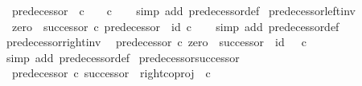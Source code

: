 \begin{isabellebody}
\ \ {\isachardoublequoteopen}predecessor\ {\isacharcolon}{\kern0pt}\ {\isasymnat}\isactrlsub c\ {\isasymrightarrow}\ {\isasymone}\ {\isasymCoprod}\ {\isasymnat}\isactrlsub c{\isachardoublequoteclose}\isanewline
%
\isadelimproof
\ \ %
\endisadelimproof
%
\isatagproof
{}\isamarkupfalse%
\ {\isacharparenleft}{\kern0pt}simp\ add{\isacharcolon}{\kern0pt}\ predecessor{\isacharunderscore}{\kern0pt}def{}{\isacharparenright}{\kern0pt}%
\endisatagproof
{\isafoldproof}%
%
\isadelimproof
\isanewline
%
\endisadelimproof
\isanewline
{}\isamarkupfalse%
\ predecessor{\isacharunderscore}{\kern0pt}left{\isacharunderscore}{\kern0pt}inv{\isacharcolon}{\kern0pt}\isanewline
\ \ {\isachardoublequoteopen}{\isacharparenleft}{\kern0pt}zero\ {\isasymamalg}\ successor{\isacharparenright}{\kern0pt}\ {\isasymcirc}\isactrlsub c\ predecessor\ {\isacharequal}{\kern0pt}\ id\ {\isasymnat}\isactrlsub c{\isachardoublequoteclose}\isanewline
%
\isadelimproof
\ \ %
\endisadelimproof
%
\isatagproof
{}\isamarkupfalse%
\ {\isacharparenleft}{\kern0pt}simp\ add{\isacharcolon}{\kern0pt}\ predecessor{\isacharunderscore}{\kern0pt}def{}{\isacharparenright}{\kern0pt}%
\endisatagproof
{\isafoldproof}%
%
\isadelimproof
\isanewline
%
\endisadelimproof
\isanewline
{}\isamarkupfalse%
\ predecessor{\isacharunderscore}{\kern0pt}right{\isacharunderscore}{\kern0pt}inv{\isacharcolon}{\kern0pt}\isanewline
\ \ {\isachardoublequoteopen}predecessor\ {\isasymcirc}\isactrlsub c\ {\isacharparenleft}{\kern0pt}zero\ {\isasymamalg}\ successor{\isacharparenright}{\kern0pt}\ {\isacharequal}{\kern0pt}\ id\ {\isacharparenleft}{\kern0pt}{\isasymone}\ {\isasymCoprod}\ {\isasymnat}\isactrlsub c{\isacharparenright}{\kern0pt}{\isachardoublequoteclose}\isanewline
%
\isadelimproof
\ \ %
\endisadelimproof
%
\isatagproof
{}\isamarkupfalse%
\ {\isacharparenleft}{\kern0pt}simp\ add{\isacharcolon}{\kern0pt}\ predecessor{\isacharunderscore}{\kern0pt}def{}{\isacharparenright}{\kern0pt}%
\endisatagproof
{\isafoldproof}%
%
\isadelimproof
\isanewline
%
\endisadelimproof
\isanewline
{}\isamarkupfalse%
\ predecessor{\isacharunderscore}{\kern0pt}successor{\isacharcolon}{\kern0pt}\isanewline
\ \ {\isachardoublequoteopen}predecessor\ {\isasymcirc}\isactrlsub c\ successor\ {\isacharequal}{\kern0pt}\ right{\isacharunderscore}{\kern0pt}coproj\ {\isasymone}\ {\isasymnat}\isactrlsub c{\isachardoublequoteclose}\isanewline
%
\isadelimproof
%
\endisadelimproof
%
\isatagproof
{}\isamarkupfalse%
\ {\isacharminus}{\kern0pt}\isanewline

\end{isabellebody}
